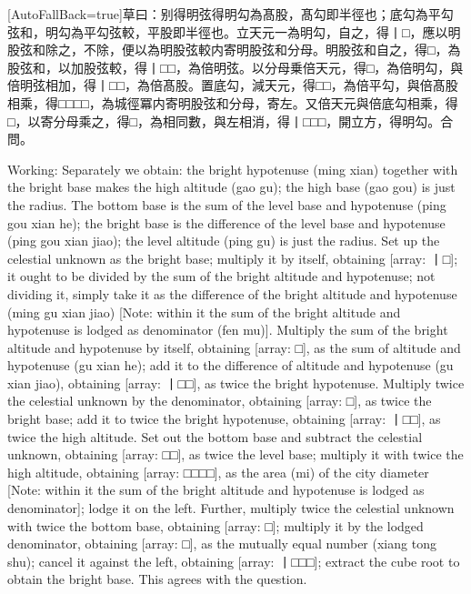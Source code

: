 \documentclass[11pt]{article}
\newcommand{\zhsmall}{\footnotesize\color{black!70}}
\newcommand{\unitlabel}[1]{\marginpar{\raggedleft\tiny\color{gray}#1}}
\newenvironment{unitzh}{\par\CJKfontspec{Noto Serif CJK SC}[AutoFallBack=true]\large\linespread{1.25}\selectfont}{\par}
\newenvironment{uniten}{\par\small\color{black!85}}{\par\medskip}
\begin{document}
\begin{unitzh}\unitlabel{ceyuan-013.4}草曰：别得明弦得明勾為髙股，髙勾即半徑也；底勾為平勾弦和，明勾為平勾弦較，平股即半徑也。立天元一為明勾，自之，得丨□，應以明股弦和除之，不除，便以為明股弦較{\zhsmall 内寄明股弦和分母}。明股弦和自之，得□，為股弦和，以加股弦較，得丨□□，為倍明弦。以分母乗倍天元，得□，為倍明勾，與倍明弦相加，得丨□□，為倍髙股。置底勾，減天元，得□□，為倍平勾，與倍髙股相乘，得□□□□，為城徑冪{\zhsmall 内寄明股弦和分母}，寄左。又倍天元與倍底勾相乘，得□，以寄分母乘之，得□，為相同數，與左相消，得丨□□□，開立方，得明勾。合問。\end{unitzh}
\begin{uniten}Working: Separately we obtain: the bright hypotenuse (ming xian) together with the bright base makes the high altitude (gao gu); the high base (gao gou) is just the radius. The bottom base is the sum of the level base and hypotenuse (ping gou xian he); the bright base is the difference of the level base and hypotenuse (ping gou xian jiao); the level altitude (ping gu) is just the radius. Set up the celestial unknown as the bright base; multiply it by itself, obtaining [array: 丨□]; it ought to be divided by the sum of the bright altitude and hypotenuse; not dividing it, simply take it as the difference of the bright altitude and hypotenuse (ming gu xian jiao) [Note: within it the sum of the bright altitude and hypotenuse is lodged as denominator (fen mu)]. Multiply the sum of the bright altitude and hypotenuse by itself, obtaining [array: □], as the sum of altitude and hypotenuse (gu xian he); add it to the difference of altitude and hypotenuse (gu xian jiao), obtaining [array: 丨□□], as twice the bright hypotenuse. Multiply twice the celestial unknown by the denominator, obtaining [array: □], as twice the bright base; add it to twice the bright hypotenuse, obtaining [array: 丨□□], as twice the high altitude. Set out the bottom base and subtract the celestial unknown, obtaining [array: □□], as twice the level base; multiply it with twice the high altitude, obtaining [array: □□□□], as the area (mi) of the city diameter [Note: within it the sum of the bright altitude and hypotenuse is lodged as denominator]; lodge it on the left. Further, multiply twice the celestial unknown with twice the bottom base, obtaining [array: □]; multiply it by the lodged denominator, obtaining [array: □], as the mutually equal number (xiang tong shu); cancel it against the left, obtaining [array: 丨□□□]; extract the cube root to obtain the bright base. This agrees with the question.\end{uniten}
\end{document}
